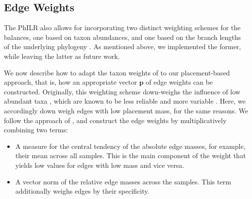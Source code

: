 


\subsection{Edge Weights}
\label{ch:Balances:sec:Methods:sub:EdgeWeights}

The PhILR also allows for incorporating two distinct weighting schemes for the balances,
one based on taxon abundances, and one based on the branch lengths of the underlying phylogeny \cite{Silverman2017}.
As mentioned above, we implemented the former, while leaving the latter as future work.

We now describe how to adapt the taxon weights of \cite{Silverman2017} to our placement-based approach,
that is, how an appropriate vector $\bm{p}$ of edge weights can be constructed.
Originally, this weighting scheme down-weighs the influence of low abundant taxa \cite{Silverman2017},
which are known to be less reliable and more variable \cite{Good1956}.
Here, we accordingly down weigh edges with low placement mass, for the same reasons.
We follow the approach of \cite{Silverman2017}, and construct the edge weights by multiplicatively combining two terms:

\begin{itemize}
    \item A measure for the central tendency of the absolute edge masses, for example, their mean across all samples.
          This is the main component of the weight that yields low values for edges with low mass and vice versa.
    \item A vector norm of the relative edge masses across the samples.
          This term additionally weighs edges by their specificity.
\end{itemize}

